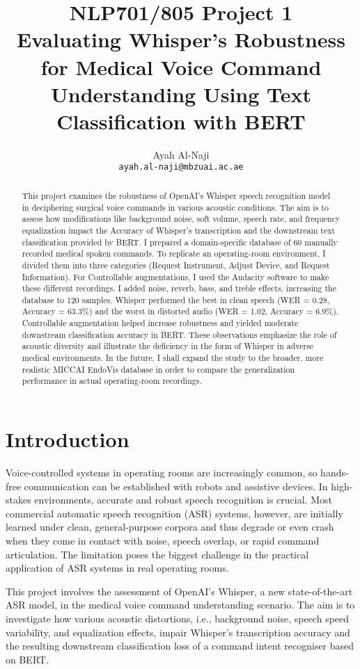 \documentclass[11pt,a4paper]{article}
\title{NLP701/805 Project 1
 \\ Evaluating Whisper’s Robustness for Medical Voice Command Understanding Using Text Classification with BERT }
\author{
 Ayah Al-Naji \\
  \texttt{ayah.al-naji@mbzuai.ac.ae} \\}
\date{}
\begin{document}
\maketitle
\begin{abstract}
This project examines the robustness of OpenAI's Whisper speech recognition model in deciphering surgical voice commands in various acoustic conditions. The aim is to assess how modifications like background noise, soft volume, speech rate, and frequency equalization impact the Accuracy of Whisper's transcription and the downstream text classification provided by BERT. I prepared a domain-specific database of 60 manually recorded medical spoken commands. To replicate an operating-room environment, I divided them into three categories (Request Instrument, Adjust Device, and Request Information). For Controllable augmentations, I used the Audacity software to make these different recordings. I added noise, reverb, bass, and treble effects, increasing the database to 120 samples. Whisper performed the best in clean speech (WER = 0.28, Accuracy = 63.3\%) and the worst in distorted audio (WER = 1.02, Accuracy = 6.9\%). Controllable augmentation helped increase robustness and yielded moderate downstream classification accuracy in BERT. These observations emphasize the role of acoustic diversity and illustrate the deficiency in the form of Whisper in adverse medical environments. In the future, I shall expand the study to the broader, more realistic MICCAI EndoVis database in order to compare the generalization performance in actual operating-room recordings.
\end{abstract}


\section{Introduction}

Voice-controlled systems in operating rooms are increasingly common, so hands-free communication can be established with robots and assistive devices. In high-stakes environments, accurate and robust speech recognition is crucial. Most commercial automatic speech recognition (ASR) systems, however, are initially learned under clean, general-purpose corpora and thus degrade or even crash when they come in contact with noise, speech overlap, or rapid command articulation. The limitation poses the biggest challenge in the practical application of ASR systems in real operating rooms.

This project involves the assessment of OpenAI's Whisper, a new state-of-the-art ASR model, in the medical voice command understanding scenario. The aim is to investigate how various acoustic distortions, i.e., background noise, speech speed variability, and equalization effects, impair Whisper's transcription accuracy and the resulting downstream classification loss of a command intent recogniser based on BERT.
\end{document}
